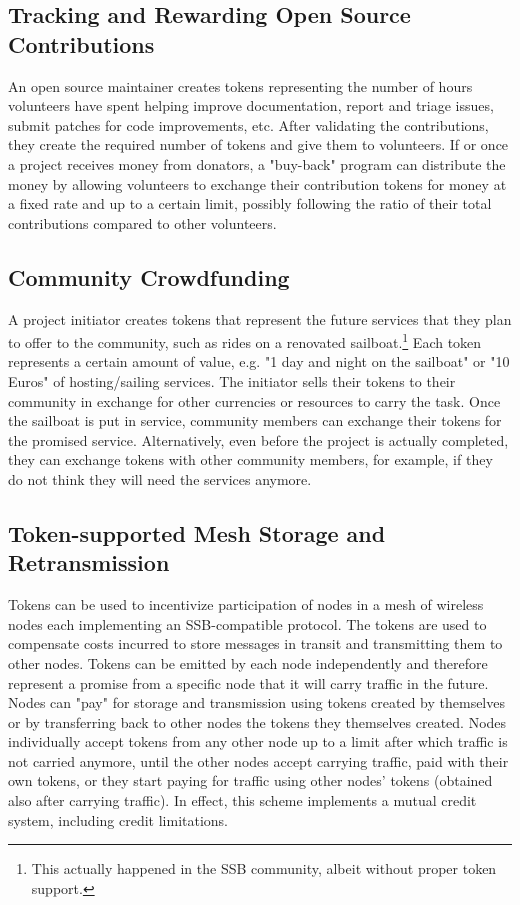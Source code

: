 \documentclass[sigplan,screen,10pt]{acmart}
\begin{document}
\subsection{Tracking and Rewarding Open Source Contributions}
\label{section:tracking-oss-contributions}

An open source maintainer creates tokens representing the number of hours volunteers have spent helping improve documentation, report and triage issues, submit patches for code improvements, etc. After validating the contributions, they create the required number of tokens and give them to volunteers. If or once a project receives money from donators, a "buy-back" program can distribute the money by allowing volunteers to exchange their contribution tokens for money at a fixed rate and up to a certain limit, possibly following the ratio of their total contributions compared to other volunteers.

\subsection{Community Crowdfunding}

A project initiator creates tokens that represent the future services that they plan to offer to the community, such as rides on a renovated sailboat.\footnote{This actually happened in the SSB community, albeit without proper token support.} Each token represents a certain amount of value, e.g. "1 day and night on the sailboat" or "10 Euros" of hosting/sailing services. The initiator sells their tokens to their community in exchange for other currencies or resources to carry the task. Once the sailboat is put in service, community members can exchange their tokens for the promised service. Alternatively, even before the project is actually completed, they can exchange tokens with other community members, for example, if they do not think they will need the services anymore.

\subsection{Token-supported Mesh Storage and Retransmission}

Tokens can be used to incentivize participation of nodes in a mesh of wireless nodes each implementing an SSB-compatible protocol. The tokens are used to compensate  costs incurred to store messages in transit and transmitting them to other nodes. Tokens can be emitted by each node independently and therefore represent a promise from a specific node that it will carry traffic in the future. Nodes can "pay" for storage and transmission using tokens created by themselves or by transferring back to other nodes the tokens they themselves created. Nodes individually accept tokens from any other node up to a limit after which traffic is not carried anymore, until the other nodes accept carrying traffic, paid with their own tokens, or they start paying for traffic using other nodes' tokens (obtained also after carrying traffic). In effect, this scheme implements a mutual credit system, including credit limitations.
\end{document}
